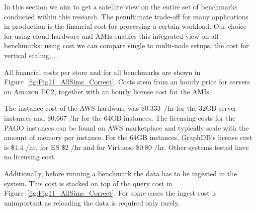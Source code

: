 %

In this section we aim to get a satellite view on the entire set of benchmarks conducted within this research. The penultimate trade-off for many applications in production is the financial cost for processing a certain workload. Our choice for using cloud hardware and AMIs enables this integrated view on all benchmarks: using cost we can compare single to multi-node setups, the cost for vertical scaling,... 

All financial costs per store and for all benchmarks are shown in Figure~\ref{fig:Fig11_AllSims_Correct}. 
Costs stem from an hourly price for servers on Amazon EC2, together with an hourly license cost for the AMIs.

The instance cost of the AWS hardware was \mbox{\$0.333 /hr} for the 32GB server instances and \$0.667 /hr for the 64GB instances. The licensing costs for the PAGO instances can be found on AWS marketplace and typically scale with the amount of memory per instance. For the 64GB instances, GraphDB's license cost is \$1.4 /hr, for ES \$2 /hr and for Virtuoso \$0.80 /hr. Other systems tested have no licensing cost.

Additionally, before running a benchmark the data has to be ingested in the system. This cost is stacked on top of the query cost in Figure~\ref{fig:Fig11_AllSims_Correct}. For some cases the ingest cost is unimportant as reloading the data is required only rarely.

